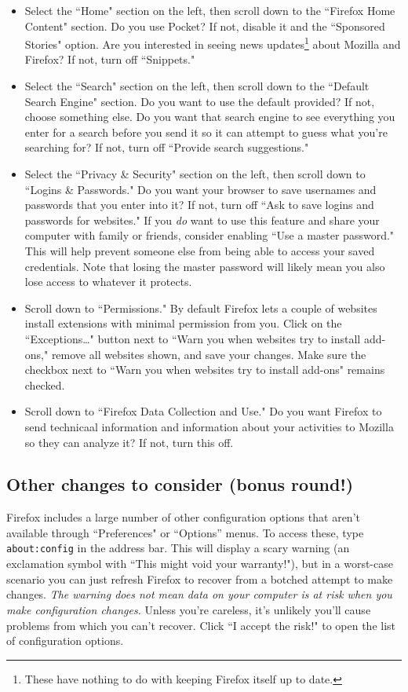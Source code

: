 \documentclass[fontsize=11pt]{article}
\begin{document}
\begin{itemize}
	\item Select the ``Home" section on the left, then scroll down to the ``Firefox Home Content" section.  Do you use Pocket?  If not, disable it and the ``Sponsored Stories" option.  Are you interested in seeing news updates\footnote{These have nothing to do with keeping Firefox itself up to date.} about Mozilla and Firefox?  If not, turn off ``Snippets."

	\item Select the ``Search" section on the left, then scroll down to the ``Default Search Engine" section.  Do you want to use the default provided?  If not, choose something else.  Do you want that search engine to see everything you enter for a search before you send it so it can attempt to guess what you're searching for?  If not, turn off ``Provide search suggestions."

	\item Select the ``Privacy \& Security" section on the left, then scroll down to ``Logins \& Passwords."  Do you want your browser to save usernames and passwords that you enter into it?  If not, turn off ``Ask to save logins and passwords for websites."  If you \emph{do} want to use this feature and share your computer with family or friends, consider enabling ``Use a master password."  This will help prevent someone else from being able to access your saved credentials.  Note that losing the master password will likely mean you also lose access to whatever it protects.

	\item Scroll down to ``Permissions."  By default Firefox lets a couple of websites install extensions with minimal permission from you.  Click on the ``Exceptions\ldots{}" button next to ``Warn you when websites try to install add-ons," remove all websites shown, and save your changes.  Make sure the checkbox next to ``Warn you when websites try to install add-ons" remains checked.

	\item Scroll down to ``Firefox Data Collection and Use."  Do you want Firefox to send technicaal information and information about your activities to Mozilla so they can analyze it?  If not, turn this off.
\end{itemize}



\subsection{Other changes to consider (bonus round!)}
Firefox includes a large number of other configuration options that aren't available through ``Preferences" or ``Options'' menus.  To access these, type \texttt{about:config} in the address bar.  This will display a scary warning (an exclamation symbol with ``This might void your warranty!"), but in a worst-case scenario you can just refresh Firefox to recover from a botched attempt to make changes.  \emph{The warning does not mean data on your computer is at risk when you make configuration changes.}  Unless you're careless, it's unlikely you'll cause problems from which you can't recover.  Click ``I accept the risk!" to open the list of configuration options.
\end{document}
